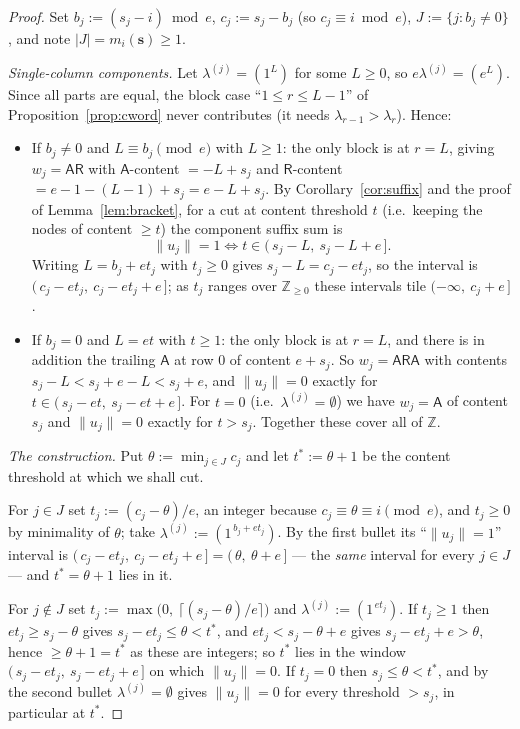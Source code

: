\documentclass[11pt]{article}
\theoremstyle{definition}
\newcommand{\ZZ}{\mathbb{Z}}
\newcommand{\Aa}{{\mathsf A}}
\newcommand{\Rr}{{\mathsf R}}
\newcommand{\bs}{\mathbf{s}}
\begin{document}
\begin{proof}
Set $b_j := (s_j - i)\bmod e$, $c_j := s_j - b_j$ (so $c_j \equiv i \bmod e$),
$J := \{ j : b_j \ne 0\}$, and note $|J| = m_i(\bs) \ge 1$.

\smallskip\noindent\emph{Single-column components.} Let
$\lambda^{(j)} = (1^{L})$ for some $L \ge 0$, so $e\lambda^{(j)} = (e^L)$.
Since all parts are equal, the block case ``$1 \le r \le L-1$'' of
Proposition~\ref{prop:cword} never contributes (it needs
$\lambda_{r-1} > \lambda_r$). Hence:
\begin{itemize}
\item If $b_j \ne 0$ and $L \equiv b_j \pmod e$ with $L \ge 1$: the only
  block is at $r = L$, giving $w_j = \Aa\Rr$ with
  $\Aa$-content $= -L + s_j$ and $\Rr$-content $= e - 1 - (L-1) + s_j = e - L + s_j$.
  By Corollary~\ref{cor:suffix} and the proof of Lemma~\ref{lem:bracket},
  for a cut at content threshold $t$ (i.e.\ keeping the nodes of content
  $\ge t$) the component suffix sum is
  \[
    \|u_j\| = 1 \iff t \in (\,s_j - L,\ s_j - L + e\,] .
  \]
  Writing $L = b_j + e t_j$ with $t_j \ge 0$ gives
  $s_j - L = c_j - e t_j$, so the interval is
  $(\,c_j - e t_j,\ c_j - e t_j + e\,]$; as $t_j$ ranges over
  $\ZZ_{\ge 0}$ these intervals tile $(-\infty,\ c_j + e\,]$.
\item If $b_j = 0$ and $L = e t$ with $t \ge 1$: the only block is at
  $r = L$, and there is in addition the trailing $\Aa$ at row $0$ of
  content $e + s_j$. So $w_j = \Aa\Rr\Aa$ with contents
  $s_j - L < s_j + e - L < s_j + e$, and $\|u_j\| = 0$ exactly for
  $t \in (\,s_j - et,\ s_j - et + e\,]$. For $t = 0$ (i.e.\
  $\lambda^{(j)} = \emptyset$) we have $w_j = \Aa$ of content $s_j$ and
  $\|u_j\| = 0$ exactly for $t > s_j$. Together these cover all of $\ZZ$.
\end{itemize}

\smallskip\noindent\emph{The construction.} Put
$\theta := \min_{j \in J} c_j$ and let $t^\ast := \theta + 1$ be the
content threshold at which we shall cut.

For $j \in J$ set $t_j := (c_j - \theta)/e$, an integer because
$c_j \equiv \theta \equiv i \pmod e$, and $t_j \ge 0$ by minimality of
$\theta$; take $\lambda^{(j)} := (1^{\,b_j + e t_j})$. By the first
bullet its ``$\|u_j\| = 1$'' interval is
$(\,c_j - e t_j,\ c_j - e t_j + e\,] = (\,\theta,\ \theta + e\,]$ ---
the \emph{same} interval for every $j \in J$ --- and
$t^\ast = \theta + 1$ lies in it.

For $j \notin J$ set $t_j := \max\bigl(0,\ \lceil (s_j - \theta)/e \rceil\bigr)$
and $\lambda^{(j)} := (1^{\,e t_j})$. If $t_j \ge 1$ then
$e t_j \ge s_j - \theta$ gives $s_j - e t_j \le \theta < t^\ast$, and
$e t_j < s_j - \theta + e$ gives $s_j - e t_j + e > \theta$, hence
$\ge \theta + 1 = t^\ast$ as these are integers; so $t^\ast$ lies in the
window $(\,s_j - e t_j,\ s_j - e t_j + e\,]$ on which $\|u_j\| = 0$.
If $t_j = 0$ then $s_j \le \theta < t^\ast$, and by the second bullet
$\lambda^{(j)} = \emptyset$ gives $\|u_j\| = 0$ for every threshold
$> s_j$, in particular at $t^\ast$.


\end{proof}
\end{document}
